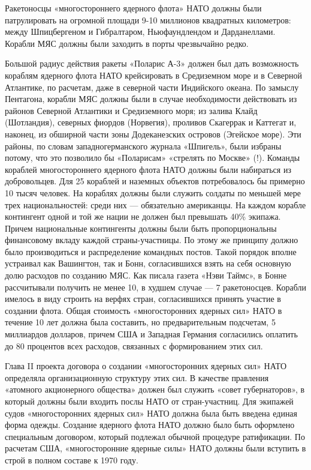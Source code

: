 \documentclass[12pt, a4paper, openany]{book}
\begin{document}
	
	
	Ракетоносцы «многостороннего ядерного флота» НАТО должны были патрулировать на огромной площади 9-10 миллионов квадратных километров: между Шпицбергеном и Гибралтаром, Ньюфаундлендом и Дарданеллами. Корабли МЯС должны были заходить в порты чрезвычайно редко.
	
	Большой радиус действия ракеты «Поларис А-3» должен был дать возможность кораблям ядерного флота НАТО крейсировать в Средиземном море и в Северной Атлантике, по расчетам, даже в северной части Индийского океана. По замыслу Пентагона, корабли МЯС должны были в случае необходимости действовать из районов Северной Атлантики и Средиземного моря; из залива Клайд (Шотландия), северных фиордов (Норвегия), проливов Скагеррак и Каттегат и, наконец, из обширной части зоны Додеканезских островов (Эгейское море). Эти районы, по словам западногерманского журнала «Шпигель», были избраны потому, что это позволило бы «Поларисам» «стрелять по Москве» (!). Команды кораблей многостороннего ядерного флота НАТО должны были набираться из добровольцев. Для 25 кораблей и наземных объектов потребовалось бы примерно 10 тысяч человек. На кораблях должны были служить солдаты по меньшей мере трех национальностей: среди них — обязательно американцы. На каждом корабле контингент одной и той же нации не должен был превышать 40\% экипажа. Причем национальные контингенты должны были быть пропорциональны финансовому вкладу каждой страны-участницы. По этому же принципу должно было производиться и распределение командных постов. Такой порядок вполне устраивал как Вашингтон, так и Бонн, согласившихся взять на себя основную долю расходов по созданию МЯС. Как писала газета «Нэви Таймс», в Бонне рассчитывали получить не менее 10, в худшем случае — 7 ракетоносцев. Корабли имелось в виду строить на верфях стран, согласившихся принять участие в создании флота. Общая стоимость «многосторонних ядерных сил» НАТО в течение 10 лет должна была составить, но предварительным подсчетам, 5 миллиардов долларов, причем США и Западная Германия согласились оплатить до 80 процентов всех расходов, связанных с формированием этих сил.
	
	Глава II проекта договора о создании «многосторонних ядерных сил» НАТО определяла организационную структуру этих сил. В качестве правления «атомного акционерного общества» должен был служить «совет губернаторов», в который должны были входить послы НАТО от стран-участниц. Для экипажей судов «многосторонних ядерных сил» НАТО должна была быть введена единая форма одежды. Создание ядерного флота НАТО должно было быть оформлено специальным договором, который подлежал обычной процедуре ратификации. По расчетам США, «многосторонние ядерные силы» НАТО должны были вступить в строй в полном составе к 1970 году.
	
\end{document}

